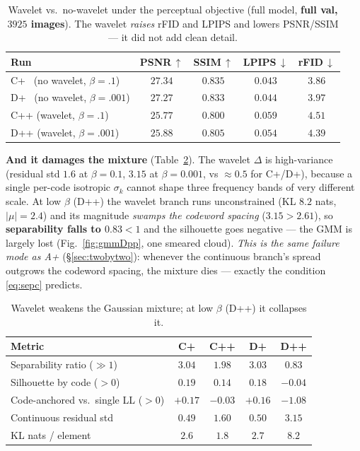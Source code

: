 \documentclass[11pt]{article}
\newcommand{\good}[1]{\textcolor{green!55!black}{#1}}
\newcommand{\bad}[1]{\textcolor{red!70!black}{#1}}
\begin{document}
\begin{table}[h]
\centering
\caption{Wavelet vs.\ no-wavelet under the perceptual objective (full model, \textbf{full val,
$3925$ images}). The wavelet \emph{raises} rFID and LPIPS and lowers PSNR/SSIM --- it did not add
clean detail.}
\label{tab:wavelet}
\begin{tabular}{lcccc}
\toprule
Run & PSNR\,$\uparrow$ & SSIM\,$\uparrow$ & LPIPS\,$\downarrow$ & \textbf{rFID}\,$\downarrow$\\
\midrule
C+ \ (no wavelet, $\beta{=}.1$)   & \good{$27.34$} & \good{$0.835$} & \good{$0.043$} & \good{$3.86$}\\
D+ \ (no wavelet, $\beta{=}.001$) & \good{$27.27$} & \good{$0.833$} & \good{$0.044$} & \good{$3.97$}\\
C++ (wavelet, $\beta{=}.1$)       & \bad{$25.77$}  & \bad{$0.800$}  & \bad{$0.059$}  & \bad{$4.51$}\\
D++ (wavelet, $\beta{=}.001$)     & \bad{$25.88$}  & \bad{$0.805$}  & \bad{$0.054$}  & \bad{$4.39$}\\
\bottomrule
\end{tabular}
\end{table}

\textbf{And it damages the mixture} (Table~\ref{tab:waveletgmm}). The wavelet $\Delta$ is
high-variance (residual std $1.6$ at $\beta{=}0.1$, \textbf{$3.15$} at $\beta{=}0.001$, vs
$\approx0.5$ for C+/D+), because a single per-code isotropic $\sigma_k$ cannot shape three
frequency bands of very different scale. At low $\beta$ (D++) the wavelet branch runs unconstrained
(KL $8.2$ nats, $|\mu|{=}2.4$) and its magnitude \emph{swamps the codeword spacing}
($3.15>2.61$), so \textbf{separability falls to $0.83<1$} and the silhouette goes negative --- the
GMM is largely lost (Fig.~\ref{fig:gmmDpp}, one smeared cloud). \emph{This is the same failure mode
as A+} (\S\ref{sec:twobytwo}): whenever the continuous branch's spread outgrows the codeword
spacing, the mixture dies --- exactly the condition \eqref{eq:sepc} predicts.

\begin{table}[h]
\centering
\caption{Wavelet weakens the Gaussian mixture; at low $\beta$ (D++) it collapses it.}
\label{tab:waveletgmm}
\small
\begin{tabular}{lcccc}
\toprule
Metric & \textbf{C+} & \textbf{C++} & \textbf{D+} & \textbf{D++}\\
\midrule
Separability ratio ($\gg1$)      & \good{$3.04$} & $1.98$ & \good{$3.03$} & \bad{$0.83$}\\
Silhouette by code ($>0$)        & \good{$0.19$} & $0.14$ & \good{$0.18$} & \bad{$-0.04$}\\
Code-anchored vs.\ single LL ($>0$) & \good{$+0.17$} & \bad{$-0.03$} & \good{$+0.16$} & \bad{$-1.08$}\\
Continuous residual std          & $0.49$ & $1.60$ & $0.50$ & $3.15$\\
KL nats / element                & $2.6$  & $1.8$  & $2.7$  & $8.2$\\
\bottomrule
\end{tabular}
\end{table}
\end{document}
